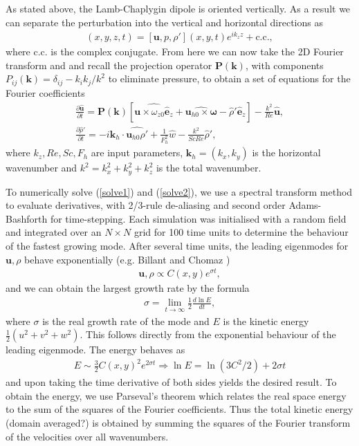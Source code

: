As stated above, the Lamb-Chaplygin dipole is oriented vertically. As a result we can separate the perturbation into the vertical and horizontal directions as 
\begin{align} 
[\tilde{\bm{u}},\tilde{p},\tilde{\rho}'](x,y,z,t) = [\bm{u},p,\rho'](x,y,t)e^{ik_{z}z} + \text{c.c.},
\end{align}
where c.c. is the complex conjugate. From here we can now take the 2D Fourier transform and and recall the projection operator $\textbf{P}(\textbf{k})$, with components $P_{ij}(\textbf{k})=\delta_{ij} - k_{i}k_{j}/k^{2}$ to eliminate pressure, to obtain a set of equations for the Fourier coefficients 
\begin{align}
\frac{\partial \hat{\bm{u}}}{\partial t} = \textbf{P}(\textbf{k})[\widehat{\bm{u}\times \omega_{z0}\hat{\bm{e}}_{z}} + \widehat{\bm{u}_{h0}\times\bm{\omega}}-\hat{\rho}'\hat{\bm{e}}_{z}] - \frac{k^{2}}{Re}\hat{\bm{u}},\label{solve1}\\
\frac{\partial\hat{\rho}'}{\partial t} = -i\bm{k}_{h}\cdot\widehat{\bm{u}_{h0}\rho'} + \frac{1}{F_{h}^{2}}\hat{w}- \frac{k^{2}}{ScRe}\hat{\rho}',\label{solve2}
\end{align}
where $k_{z},Re,Sc,F_{h}$ are input parameters, $\bm{k}_{h}=(k_{x},k_{y})$ is the horizontal wavenumber and $k^{2}=k_{x}^{2}+k_{y}^{2}+k_{z}^{2}$ is the total wavenumber. 

To numerically solve (\ref{solve1}) and (\ref{solve2}), we use a spectral transform method to evaluate derivatives, with 2/3-rule de-aliasing and second order Adams-Bashforth for time-stepping. Each simulation was initialised with a random field and integrated over an $N\times N$ grid for 100 time units to determine the behaviour of the fastest growing mode. After several time units, the leading eigenmodes for $\bm{u},\rho$ behave exponentially (e.g. Billant and Chomaz \cite{bc2000c})
\begin{align}
\bm{u},\rho \propto C(x,y)e^{\sigma t},
\end{align}
and we can obtain the largest growth rate by the formula
\begin{align}
\sigma = \lim_{t\rightarrow\infty}\frac{1}{2}\frac{d\ln E}{dt}\label{sigma1},
\end{align}
where $\sigma$ is the real growth rate of the mode and $E$ is the kinetic energy $\frac{1}{2}(u^{2}+v^{2}+w^{2})$. This follows directly from the exponential behaviour of the leading eigenmode. The energy behaves as
\begin{align}
E \sim \frac{3}{2}C(x,y)^{2}e^{2\sigma t} \Rightarrow \ln E = \ln(3C^{2}/2) + 2\sigma t
\end{align}
and upon taking the time derivative of both sides yields the desired result. To obtain the energy, we use Parseval's theorem which relates the real space energy to the sum of the squares of the Fourier coefficients. Thus the total kinetic energy (domain averaged?) is obtained by summing the squares of the Fourier transform of the velocities over all wavenumbers. 

